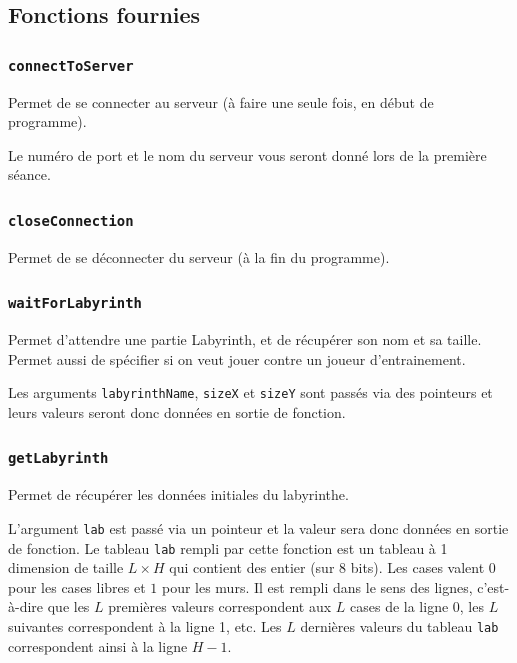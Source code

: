 \documentclass[french,12pt,a4paper,twoside,openright,titlepage]{report}
\begin{document}
\subsection{Fonctions fournies}
 
\subsubsection{\texttt{connectToServer}}
Permet de se connecter au serveur (à faire une seule fois, en début de programme).

Le numéro de port et le nom du serveur vous seront donné lors de la première séance.



\subsubsection{\texttt{closeConnection}}
Permet de se déconnecter du serveur (à la fin du programme).



\subsubsection{\texttt{waitForLabyrinth}}
Permet d'attendre une partie Labyrinth, et de récupérer son nom et sa taille. Permet aussi de spécifier si on veut jouer contre un joueur d'entrainement.
\label{sec:wait}

Les arguments \texttt{labyrinthName}, \texttt{sizeX} et \texttt{sizeY} sont passés via des pointeurs et leurs valeurs
seront donc données en sortie de fonction.


\subsubsection{\texttt{getLabyrinth}}
Permet de récupérer les données initiales du labyrinthe.
\label{sec:getlab}

L'argument \texttt{lab} est passé via un pointeur et 
la valeur sera donc données en sortie de fonction. Le tableau \texttt{lab} rempli par cette
fonction est un tableau à 1 dimension de taille $L\times H$ qui contient des entier (sur 8 bits). Les cases valent $0$ pour les cases libres et $1$ pour les murs. Il est rempli dans le sens des lignes, c'est-à-dire que les $L$
premières valeurs correspondent aux $L$ cases de la ligne 0, les $L$ suivantes correspondent à la ligne 1, etc.
Les $L$ dernières valeurs du tableau \verb|lab| correspondent ainsi à la ligne $H-1$.
\end{document}

